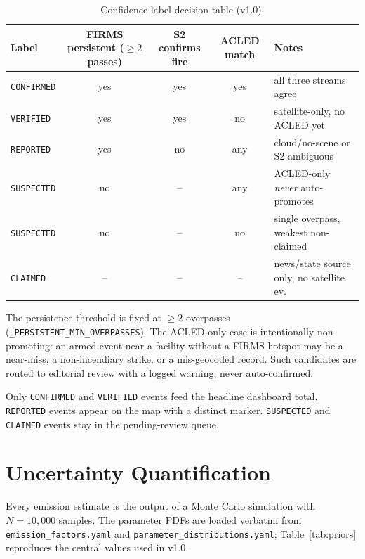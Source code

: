 \documentclass[11pt]{article}
\begin{document}
\begin{table}[h]
\centering
\caption{Confidence label decision table (v1.0).}
\label{tab:confidence}
\begin{tabular}{lcccl}
\toprule
\textbf{Label} & \textbf{FIRMS persistent ($\ge 2$ passes)} &
\textbf{S2 confirms fire} & \textbf{ACLED match} & \textbf{Notes} \\
\midrule
\texttt{CONFIRMED} & yes & yes & yes & all three streams agree \\
\texttt{VERIFIED}  & yes & yes & no  & satellite-only, no ACLED yet \\
\texttt{REPORTED}  & yes & no  & any & cloud/no-scene or S2 ambiguous \\
\texttt{SUSPECTED} & no  & --  & any & ACLED-only \emph{never} auto-promotes \\
\texttt{SUSPECTED} & no  & --  & no  & single overpass, weakest non-claimed \\
\texttt{CLAIMED}   & --  & --  & --  & news/state source only, no satellite ev. \\
\bottomrule
\end{tabular}
\end{table}

The persistence threshold is fixed at $\ge 2$ overpasses
(\texttt{\_PERSISTENT\_MIN\_OVERPASSES}). The ACLED-only case is
intentionally non-promoting: an armed event near a facility without a
FIRMS hotspot may be a near-miss, a non-incendiary strike, or a
mis-geocoded record. Such candidates are routed to editorial review with
a logged warning, never auto-confirmed.

Only \texttt{CONFIRMED} and \texttt{VERIFIED} events feed the headline
dashboard total. \texttt{REPORTED} events appear on the map with a distinct
marker. \texttt{SUSPECTED} and \texttt{CLAIMED} events stay in the
pending-review queue.

\section{Uncertainty Quantification}
\label{sec:uq}

Every emission estimate is the output of a Monte Carlo simulation with
$N = 10{,}000$ samples. The parameter PDFs are loaded verbatim from
\texttt{emission\_factors.yaml} and \texttt{parameter\_distributions.yaml};
Table~\ref{tab:priors} reproduces the central values used in v1.0.
\end{document}
